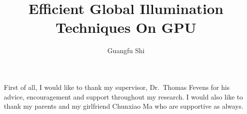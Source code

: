 \documentclass[12pt]{report}
\author{Guangfu Shi}
\title{Efficient Global Illumination Techniques On GPU}
\begin{document}


\begin{acknowledgments}
First of all, I would like to thank my supervisor, Dr.~Thomas Fevens for his advice, encouragement and support throughout my research. I would also like to thank my parents and my girlfriend Chunxiao Ma who are supportive as always.
\end{acknowledgments}


\setcounter{page}{1}

\begin{spacing}{2.0}
	








	

		

%				



\end{spacing}
\end{document}
